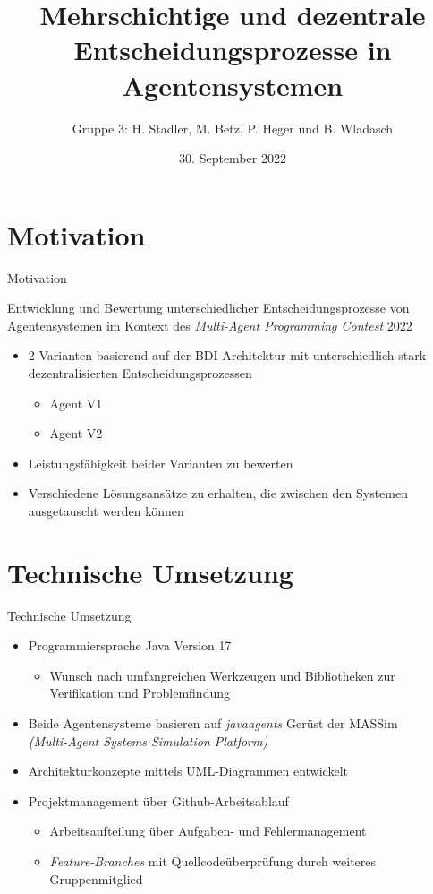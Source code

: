 \documentclass[aspectratio=169]{beamer} %
\title{Mehrschichtige und dezentrale
Entscheidungsprozesse in Agentensystemen}
\author[H. Stadler, M. Betz]{Gruppe 3: H. Stadler, M. Betz, P. Heger und B. Wladasch}
\institute{
Fachpraktikum Künstliche Intelligenz: Multiagentenprogrammierung \\
Artificial Intelligence Group,\\
University of Hagen, Germany}
\date{30. September 2022}
\begin{document}

\begin{frame}
  \titlepage
\end{frame}
\nologo

\section*{Motivation}
\begin{frame}{Motivation}
\begin{block}{Entwicklung und Bewertung unterschiedlicher Entscheidungsprozesse von Agentensystemen im Kontext des \textit{Multi-Agent Programming Contest} 2022}
\begin{itemize}
	\item 2 Varianten basierend auf der BDI-Architektur mit unterschiedlich stark dezentralisierten Entscheidungsprozessen
	\begin{itemize}
		\item Agent V1
		\item Agent V2
	\end{itemize}
	\item Leistungsfähigkeit beider Varianten zu bewerten
	\item Verschiedene Lösungsansätze zu erhalten, die zwischen den Systemen ausgetauscht werden können
\end{itemize}
\end{block}
\end{frame}

\section{Technische Umsetzung}
\begin{frame}{Technische Umsetzung}
\begin{itemize}
\setlength\itemsep{5mm}
	\item Programmiersprache Java Version 17
	\begin{itemize}
		\item Wunsch nach umfangreichen Werkzeugen und Bibliotheken zur Verifikation und Problemfindung
	\end{itemize}
	\item Beide Agentensysteme basieren auf \textit{javaagents} Gerüst der MASSim \\ \textit{(Multi-Agent Systems Simulation Platform)}
	\item Architekturkonzepte mittels UML-Diagrammen entwickelt
	\item Projektmanagement über Github-Arbeitsablauf
	\begin{itemize}
		\item Arbeitsaufteilung über Aufgaben- und Fehlermanagement
		\item \textit{Feature-Branches} mit Quellcodeüberprüfung durch weiteres Gruppenmitglied 
	\end{itemize}
\end{itemize}
\end{frame}
\end{document}
